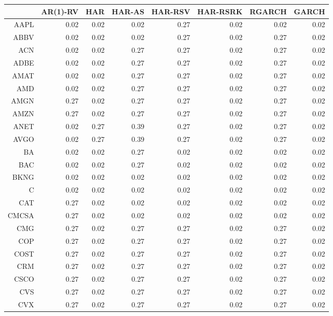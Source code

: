 \begin{table}[ht]
\centering
\begin{tabular}{rrrrrrrr}
  \hline
 & AR(1)-RV & HAR & HAR-AS & HAR-RSV & HAR-RSRK & RGARCH & GARCH \\ 
  \hline
AAPL & 0.02 & 0.02 & 0.02 & 0.27 & 0.02 & 0.02 & 0.02 \\ 
  ABBV & 0.02 & 0.02 & 0.02 & 0.27 & 0.02 & 0.27 & 0.02 \\ 
  ACN & 0.02 & 0.02 & 0.27 & 0.27 & 0.02 & 0.27 & 0.02 \\ 
  ADBE & 0.02 & 0.02 & 0.27 & 0.27 & 0.02 & 0.27 & 0.02 \\ 
  AMAT & 0.02 & 0.02 & 0.27 & 0.27 & 0.02 & 0.27 & 0.02 \\ 
  AMD & 0.02 & 0.02 & 0.27 & 0.27 & 0.02 & 0.27 & 0.02 \\ 
  AMGN & 0.27 & 0.02 & 0.27 & 0.27 & 0.02 & 0.27 & 0.02 \\ 
  AMZN & 0.27 & 0.02 & 0.27 & 0.27 & 0.02 & 0.27 & 0.02 \\ 
  ANET & 0.02 & 0.27 & 0.39 & 0.27 & 0.02 & 0.27 & 0.02 \\ 
  AVGO & 0.02 & 0.27 & 0.39 & 0.27 & 0.02 & 0.27 & 0.02 \\ 
  BA & 0.02 & 0.02 & 0.27 & 0.02 & 0.02 & 0.02 & 0.02 \\ 
  BAC & 0.02 & 0.02 & 0.27 & 0.02 & 0.02 & 0.02 & 0.02 \\ 
  BKNG & 0.02 & 0.02 & 0.02 & 0.02 & 0.02 & 0.02 & 0.02 \\ 
  C & 0.02 & 0.02 & 0.02 & 0.02 & 0.02 & 0.02 & 0.02 \\ 
  CAT & 0.27 & 0.02 & 0.02 & 0.02 & 0.02 & 0.02 & 0.02 \\ 
  CMCSA & 0.27 & 0.02 & 0.02 & 0.02 & 0.02 & 0.02 & 0.02 \\ 
  CMG & 0.27 & 0.02 & 0.27 & 0.27 & 0.02 & 0.27 & 0.02 \\ 
  COP & 0.27 & 0.02 & 0.27 & 0.27 & 0.02 & 0.27 & 0.02 \\ 
  COST & 0.27 & 0.02 & 0.27 & 0.27 & 0.02 & 0.27 & 0.02 \\ 
  CRM & 0.27 & 0.02 & 0.27 & 0.27 & 0.02 & 0.27 & 0.02 \\ 
  CSCO & 0.27 & 0.02 & 0.27 & 0.27 & 0.02 & 0.27 & 0.02 \\ 
  CVS & 0.27 & 0.02 & 0.27 & 0.27 & 0.02 & 0.27 & 0.02 \\ 
  CVX & 0.27 & 0.02 & 0.27 & 0.27 & 0.02 & 0.27 & 0.02 \\ 

\end{tabular}
\end{table}
